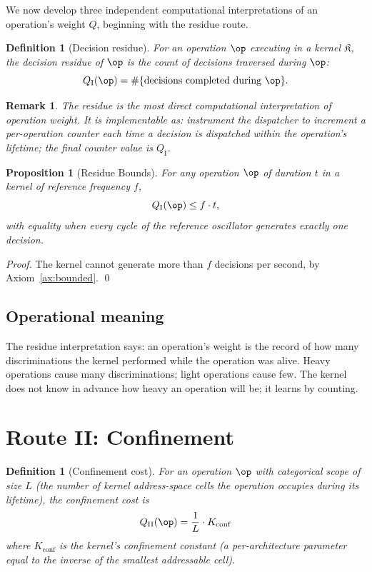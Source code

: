 \documentclass[twocolumn,11pt,a4paper]{article}
\newtheorem{proposition}[theorem]{Proposition}
\newtheorem{definition}[theorem]{Definition}
\newtheorem{remark}[theorem]{Remark}
\newcommand{\Kernel}{\mathfrak{K}}
\newcommand{\Qweight}{Q}
\begin{document}
We now develop three independent computational interpretations of an operation's weight $\Qweight$, beginning with the residue route.

\begin{definition}[Decision residue]
\label{def:residue}
For an operation $\op$ executing in a kernel $\Kernel$, the \emph{decision residue} of $\op$ is the count of decisions traversed during $\op$:
\[
\Qweight_\mathrm{I}(\op) = \#\{\text{decisions completed during } \op\}.
\]
\end{definition}

\begin{remark}
The residue is the most direct computational interpretation of operation weight. It is implementable as: instrument the dispatcher to increment a per-operation counter each time a decision is dispatched within the operation's lifetime; the final counter value is $\Qweight_\mathrm{I}$.
\end{remark}

\begin{proposition}[Residue Bounds]
\label{prop:residue-bounds}
For any operation $\op$ of duration $t$ in a kernel of reference frequency $f$,
\[
\Qweight_\mathrm{I}(\op) \leq f \cdot t,
\]
with equality when every cycle of the reference oscillator generates exactly one decision.
\end{proposition}

\begin{proof}
The kernel cannot generate more than $f$ decisions per second, by Axiom~\ref{ax:bounded}. \qed
\end{proof}

\subsection{Operational meaning}

The residue interpretation says: an operation's weight is the record of how many discriminations the kernel performed while the operation was alive. Heavy operations cause many discriminations; light operations cause few. The kernel does not know in advance how heavy an operation will be; it learns by counting.

\section{Route II: Confinement}
\label{sec:route2}

\begin{definition}[Confinement cost]
\label{def:confinement}
For an operation $\op$ with categorical scope of size $L$ (the number of kernel address-space cells the operation occupies during its lifetime), the \emph{confinement cost} is
\[
\Qweight_\mathrm{II}(\op) = \frac{1}{L} \cdot K_\mathrm{conf}
\]
where $K_\mathrm{conf}$ is the kernel's confinement constant (a per-architecture parameter equal to the inverse of the smallest addressable cell).
\end{definition}
\end{document}

